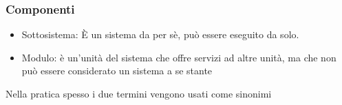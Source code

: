 \subsubsection{Componenti}
\begin{itemize}
    \item Sottosistema: \`E un sistema da per s\`e, può essere eseguito da solo.
    \item Modulo: è un’unità del sistema che offre servizi ad altre unità, ma che non può essere considerato un sistema a se stante
\end{itemize}

\noindent Nella pratica spesso i due termini vengono usati come sinonimi
